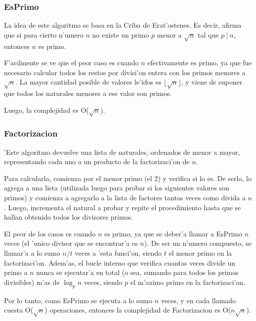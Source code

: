 \subsubsection{EsPrimo}
La idea de este algoritmo se basa en la Criba de Erat'ostenes. Es decir, afirma que si para cierto n'umero $n$ no existe un primo $p$ menor a $\sqrt{n}$ tal que $p\ |\ n$, entonces $n$ es primo. 

F'acilmente se ve que el peor caso es cuando $n$ efectivamente es primo, ya que fue necesario calcular todos los restos por divisi'on entera con los primos menores a $\sqrt{n}$. La mayor cantidad posible de valores le'idos es $\lfloor\sqrt{n}\rfloor$, y viene de suponer que todos los naturales menores a ese valor son primos.

Luego, la complejidad es O($\sqrt{n}$).


\subsubsection{Factorizacion}
'Este algoritmo devuelve una lista de naturales, ordenados de menor a mayor, representando cada uno a un producto de la factorizaci'on de $n$. 

Para calcularla, comienza por el menor primo (el 2) y verifica si lo es. De serlo, lo agrega a una lista (utilizada luego para probar si los siguientes valores son primos) y comienza a agregarlo a la lista de factores tantas veces como divida a $n$. Luego, incrementa el natural a probar y repite el procedimiento hasta que se hallan obtenido todos los divisores primos.

El peor de los casos es cuando $n$ es primo, ya que se deber'a llamar a EsPrimo $n$ veces (el 'unico divisor que se encontrar'a es $n$). De ser un n'umero compuesto, se llamar'a a lo sumo $n/t$ veces a 'esta funci'on, siendo $t$ el menor primo en la factorizaci'on. Adem'as, el bucle interno que verifica cuantas veces divide un primo a $n$ nunca se ejecutar'a en total (o sea, sumando para todos los primos divisibles) m'as de $\log_p{n}$ veces, siendo $p$ el m'aximo primo en la factorizaci'on.

Por lo tanto, como EsPrimo se ejecuta a lo sumo $n$ veces, y en cada llamado cuesta O($\sqrt{n}$) operaciones, entonces la complejidad de Factorizacion es O($n \sqrt{n}$).

